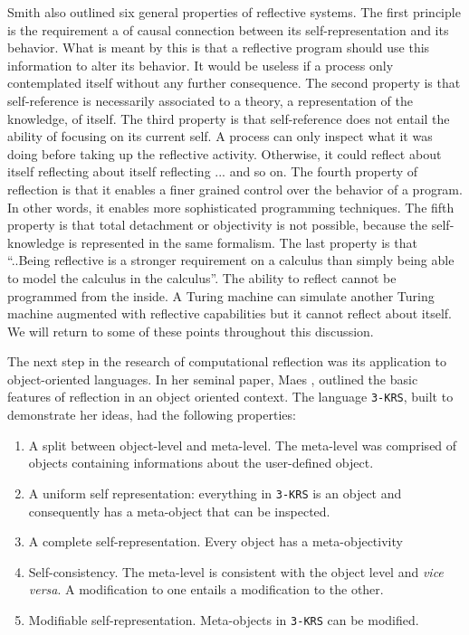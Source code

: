 Smith also outlined six general properties of reflective systems. The first principle is the requirement a of causal connection between
its self-representation and its behavior. What is meant by this is that a reflective program should use this information to alter its
behavior. It would be useless if a process only contemplated itself without any further consequence. The second property is that
self-reference is necessarily associated to a theory, a representation of the knowledge, of itself. The third property is that
self-reference does not entail the ability of focusing on its current self. A process can only inspect what it was doing before
taking up the reflective activity. Otherwise, it could reflect about itself reflecting about itself reflecting ... and so on.
The fourth property of reflection is that it enables a finer grained control over the behavior of a program. In other words, it
enables more sophisticated programming techniques. The fifth property is that total detachment or objectivity is not possible,
because the self-knowledge is represented in the same formalism. The last property is that ``..Being reflective is a stronger
requirement on a calculus than simply being able to model the calculus in the calculus''. The ability to reflect cannot be
programmed from the inside. A Turing machine can simulate another Turing machine augmented with reflective capabilities but it
cannot reflect about itself. We will return to some of these points throughout this discussion.

The next step in the research of computational reflection was its application to object-oriented languages. In her seminal paper, Maes \cite{Maes},
outlined the basic features of reflection in an object oriented context. The language \texttt{3-KRS}, built to demonstrate her ideas, had the
following properties:

\begin{enumerate}
 \item A split between object-level and meta-level. The meta-level was comprised of objects containing informations about the user-defined
object.
 \item A uniform self representation: everything in \texttt{3-KRS} is an object and consequently has a meta-object that can be inspected.
 \item A complete self-representation. Every object has a meta-objectivity
 \item Self-consistency. The meta-level is consistent with the object level and \emph{vice versa}. A modification to one entails a modification
to the other. 
  \item Modifiable self-representation. Meta-objects in \texttt{3-KRS} can be modified.
\end{enumerate}


